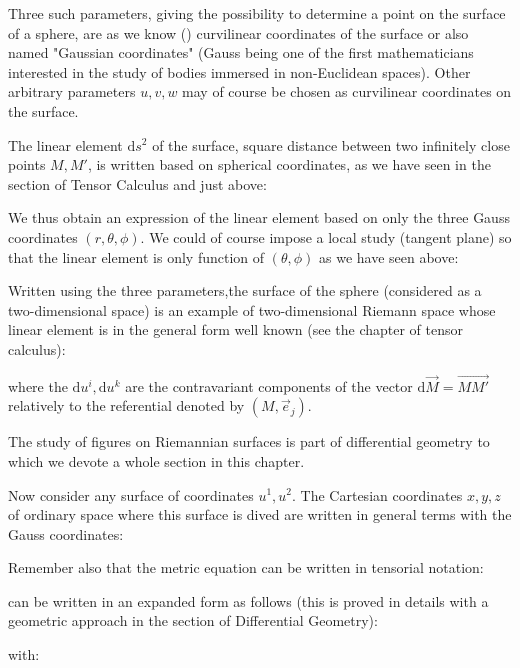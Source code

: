	Three such parameters, giving the possibility to determine a point on the surface of a sphere, are as we know () curvilinear coordinates of the surface or also named "Gaussian coordinates" (Gauss being one of the first mathematicians interested in the study of bodies immersed in non-Euclidean spaces). Other arbitrary parameters $u, v, w$ may of course be chosen as curvilinear coordinates on the surface.
	
	The linear element $\mathrm{d}s^2$ of the surface, square distance between two infinitely close points $M, M'$, is written based on spherical coordinates, as we have seen in the section of Tensor Calculus and just above:
	
	We thus obtain an expression of the linear element based on only the three Gauss  coordinates $(r,\theta,\phi)$. We could of course impose a local study (tangent plane) so that the linear element is only function of $(\theta,\phi)$ as we have seen above:
	
	Written using the three parameters,the surface of the sphere (considered as a two-dimensional space) is an example of two-dimensional Riemann space whose linear element is in the general form well known (see the chapter of tensor calculus):
	
	where the $\mathrm{d}u^i,\mathrm{d}u^k$ are the contravariant components of the vector $\mathrm{d}\vec{M}=\overrightarrow{MM'}$ relatively to the referential denoted by $(M,\vec{e}_j)$.
	\begin{tcolorbox}[title=Remark,colframe=black,arc=10pt]
	The study of figures on Riemannian surfaces is part of differential geometry to which we devote a whole section in this chapter.
	\end{tcolorbox}
	Now consider any surface of coordinates $u^1,u^2$. The Cartesian coordinates $x, y, z$ of ordinary space where this surface is dived are written in general terms with the Gauss coordinates:
	
	Remember also that the metric equation can be written in tensorial notation:
	
	can be written in an expanded form as follows (this is proved in details with a geometric approach in the section of Differential Geometry):
	
	with:
	
